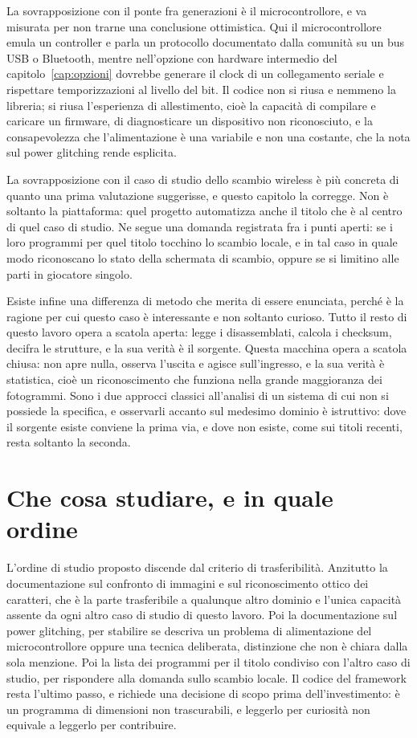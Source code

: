 La sovrapposizione con il ponte fra generazioni è il microcontrollore, e va misurata per non trarne una conclusione ottimistica. Qui il microcontrollore emula un controller e parla un protocollo documentato dalla comunità su un bus USB o Bluetooth, mentre nell'opzione con hardware intermedio del capitolo~\ref{cap:opzioni} dovrebbe generare il clock di un collegamento seriale e rispettare temporizzazioni al livello del bit. Il codice non si riusa e nemmeno la libreria; si riusa l'esperienza di allestimento, cioè la capacità di compilare e caricare un firmware, di diagnosticare un dispositivo non riconosciuto, e la consapevolezza che l'alimentazione è una variabile e non una costante, che la nota sul power glitching rende esplicita.

La sovrapposizione con il caso di studio dello scambio wireless è più concreta di quanto una prima valutazione suggerisse, e questo capitolo la corregge. Non è soltanto la piattaforma: quel progetto automatizza anche il titolo che è al centro di quel caso di studio. Ne segue una domanda registrata fra i punti aperti: se i loro programmi per quel titolo tocchino lo scambio locale, e in tal caso in quale modo riconoscano lo stato della schermata di scambio, oppure se si limitino alle parti in giocatore singolo.

Esiste infine una differenza di metodo che merita di essere enunciata, perché è la ragione per cui questo caso è interessante e non soltanto curioso. Tutto il resto di questo lavoro opera a scatola aperta: legge i disassemblati, calcola i checksum, decifra le strutture, e la sua verità è il sorgente. Questa macchina opera a scatola chiusa: non apre nulla, osserva l'uscita e agisce sull'ingresso, e la sua verità è statistica, cioè un riconoscimento che funziona nella grande maggioranza dei fotogrammi. Sono i due approcci classici all'analisi di un sistema di cui non si possiede la specifica, e osservarli accanto sul medesimo dominio è istruttivo: dove il sorgente esiste conviene la prima via, e dove non esiste, come sui titoli recenti, resta soltanto la seconda.

\section{Che cosa studiare, e in quale ordine}

L'ordine di studio proposto discende dal criterio di trasferibilità. Anzitutto la documentazione sul confronto di immagini e sul riconoscimento ottico dei caratteri, che è la parte trasferibile a qualunque altro dominio e l'unica capacità assente da ogni altro caso di studio di questo lavoro. Poi la documentazione sul power glitching, per stabilire se descriva un problema di alimentazione del microcontrollore oppure una tecnica deliberata, distinzione che non è chiara dalla sola menzione. Poi la lista dei programmi per il titolo condiviso con l'altro caso di studio, per rispondere alla domanda sullo scambio locale. Il codice del framework resta l'ultimo passo, e richiede una decisione di scopo prima dell'investimento: è un programma di dimensioni non trascurabili, e leggerlo per curiosità non equivale a leggerlo per contribuire.

